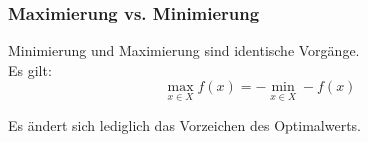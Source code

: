 \begin{frame}
 \frametitle{Maximierung vs. Minimierung}
 Minimierung und Maximierung sind identische Vorgänge.\\ Es gilt:
 \[
  \max_{x\in X} f(x) = -\min_{x\in X} -f(x)
 \]
 
 Es ändert sich lediglich das Vorzeichen des Optimalwerts.
\end{frame}
